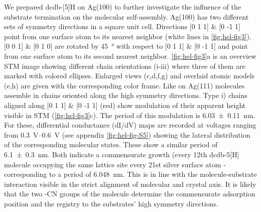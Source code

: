 We prepared dcdb-[5]H on Ag(100) to further investigate the influence of the substrate termination on the molecular self-assembly. Ag(100) has two different sets of symmetry directions in a square unit cell. Directions [0 1 1] \& [0 -1 1] point from one surface atom to its nearest neighbor (white lines in \autoref{fig:hel-fig3}). [0 0 1] \& [0 1 0] are rotated by \SI{45}{\degree} with respect to [0 1 1] \& [0 -1 1] and point from one surface atom to its second nearest neighbor. \autoref{fig:hel-fig3}a is an overview STM image showing different chain orientations (i-iii) where three of them are marked with colored ellipses. Enlarged views (c,d,f,g) and overlaid atomic models (e,h) are given with the corresponding color frame. Like on Ag(111) molecules assemble in chains oriented along the high symmetry directions. Type i) chains aligned along [0 1 1] \& [0 -1 1] (red) show modulation of their apparent height visible in STM (\autoref{fig:hel-fig3}c). The period of this modulation is \SI{6.03 \pm 0.11}{\nano \meter}. For these, differential conductance (dI/dV) maps are recorded at voltages ranging from \SIrange{0.3}{0,6}{\volt} (see appendix \autoref{fig:hel-fig-S5}) showing the lateral distribution of the corresponding molecular states. These show a similar period of \SI{6.1 \pm 0.3}{\nano \meter}. Both indicate a commensurate growth (every 12th dcdb-5[H] molecule occupying the same lattice site every 21st silver surface atom - corresponding to a period of \SI{6.048}{\nano \meter}. This is in line with the molecule-substrate interaction visible in the strict alignment of molecular and crystal axis. It is likely that the two -CN groups of the molecule determine the commensurate adsorption position and the registry to the substrates’ high symmetry directions. 

